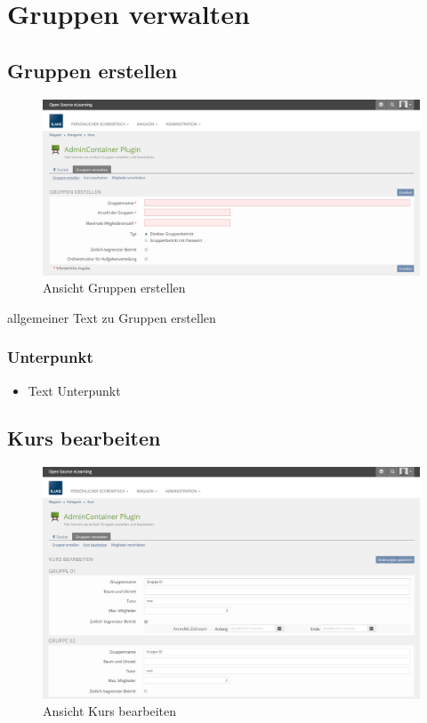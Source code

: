 \chapter{Gruppen verwalten}\label{gruppenVerwalten}
\minitoc
\clearpage

\section{Gruppen erstellen}
\begin{figure}
	\centering
	\includegraphics[width=1\textwidth]{img/gruppenErstellen.png}
	\caption{Ansicht Gruppen erstellen}
\end{figure}

allgemeiner Text zu Gruppen erstellen
\subsection*{Unterpunkt}
\begin{itemize}
	\item Text Unterpunkt
\end{itemize}

\clearpage

\section{Kurs bearbeiten}
\begin{figure}
	\centering
	\includegraphics[width=1\textwidth]{img/kursBearbeiten.png}
	\caption{Ansicht Kurs bearbeiten}
\end{figure}

